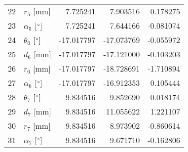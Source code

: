 \documentclass{standalone}%
\begin{document}
\begin{tabular}{llrrr}
22 &              $r_{5}$ [mm] &   7.725241 &   7.903516 &   0.178275 \\
23 &  $\alpha_{5}$ [$\degree$] &   7.725241 &   7.644166 &  -0.081074 \\
24 &  $\theta_{6}$ [$\degree$] & -17.017797 & -17.073769 &  -0.055972 \\
25 &              $d_{6}$ [mm] & -17.017797 & -17.121000 &  -0.103203 \\
26 &              $r_{6}$ [mm] & -17.017797 & -18.728691 &  -1.710894 \\
27 &  $\alpha_{6}$ [$\degree$] & -17.017797 & -16.912353 &   0.105444 \\
28 &  $\theta_{7}$ [$\degree$] &   9.834516 &   9.852690 &   0.018174 \\
29 &              $d_{7}$ [mm] &   9.834516 &  11.055622 &   1.221107 \\
30 &              $r_{7}$ [mm] &   9.834516 &   8.973902 &  -0.860614 \\
31 &  $\alpha_{7}$ [$\degree$] &   9.834516 &   9.671710 &  -0.162806 \\
\bottomrule
\end{tabular}
%
\end{document}
